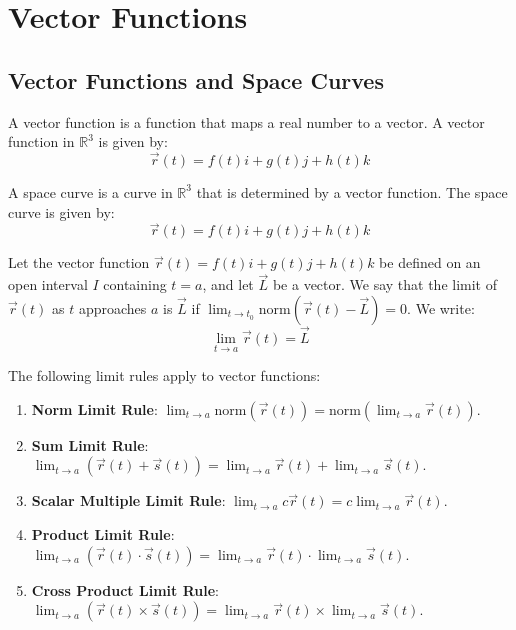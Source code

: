 \documentclass[11pt]{report}
\begin{document}
\section{Vector Functions}
\subsection{Vector Functions and Space Curves}
\begin{definition}
    A vector function is a function that maps a real number to a vector. A vector function in $\mathbb{R}^3$ is given by:
    \begin{equation}
        \vec{r}(t) = f(t)i + g(t)j + h(t)k
    \end{equation}
\end{definition}
\begin{definition}
    A space curve is a curve in $\mathbb{R}^3$ that is determined by a vector function. The space curve is given by:
    \begin{equation}
        \vec{r}(t) = f(t)i + g(t)j + h(t)k
    \end{equation}
\end{definition}
\begin{definition}[Limit]
    Let the vector function $\vec{r}(t) = f(t)i + g(t)j + h(t)k$ be defined on an open interval $I$ containing $t = a$, and let $\vec{L}$ be a vector. We say that the limit of $\vec{r}(t)$ as $t$ approaches $a$ is $\vec{L}$ if $\lim_{t \to t_0} \text{norm} (\vec{r}(t) - \vec{L}) = 0$. We write:
    \begin{equation}
        \lim_{t \to a} \vec{r}(t) = \vec{L}
    \end{equation}
\end{definition}
\begin{theorem} The following limit rules apply to vector functions:
    \begin{enumerate}
        \item \textbf{Norm Limit Rule}: $\lim_{t \to a} \text{norm} (\vec{r}(t)) = \text{norm} (\lim_{t \to a} \vec{r}(t))$.
        \item \textbf{Sum Limit Rule}: $\lim_{t \to a} (\vec{r}(t) + \vec{s}(t)) = \lim_{t \to a} \vec{r}(t) + \lim_{t \to a} \vec{s}(t)$.
        \item \textbf{Scalar Multiple Limit Rule}: $\lim_{t \to a} c\vec{r}(t) = c\lim_{t \to a} \vec{r}(t)$.
        \item \textbf{Product Limit Rule}: $\lim_{t \to a} (\vec{r}(t) \cdot \vec{s}(t)) = \lim_{t \to a} \vec{r}(t) \cdot \lim_{t \to a} \vec{s}(t)$.
        \item \textbf{Cross Product Limit Rule}: $\lim_{t \to a} (\vec{r}(t) \times \vec{s}(t)) = \lim_{t \to a} \vec{r}(t) \times \lim_{t \to a} \vec{s}(t)$.
    \end{enumerate} 
\end{theorem}
\end{document}
